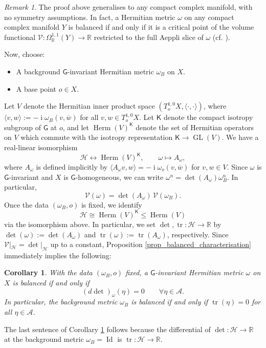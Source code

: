 \documentclass[11pt,reqno]{amsart}
\newcommand{\R}{\mathbb R}
\newcommand{\G}{\mathsf {G}}
\newcommand{\K}{\mathsf {K}}
\newcommand{\V}{\mathcal {V}}
\newcommand{\A}{\mathcal A}
\renewcommand{\H}{\mathcal H}
\renewcommand{\i}{\operatorname{i}}
\newcommand{\Id}{\operatorname{Id}}
\newcommand{\tr}{\operatorname{tr}}
\newcommand{\GL}{\operatorname{GL}}
\newcommand{\Herm}{{\operatorname{Herm}}}
\theoremstyle{plain}
\newtheorem{corollary}[theorem]{Corollary}
\theoremstyle{definition}
\theoremstyle{remark}
\newtheorem{remark}[theorem]{Remark}
\begin{document}
\begin{remark}
    \label{rem gen}
    The proof above generalises to any compact complex manifold,  with no symmetry assumptions. In fact, a Hermitian metric $\omega$ on any compact complex manifold $Y$ is balanced if and only if it is a critical point of the volume functional $\V: \Omega_\R^{1,1}(Y) \rightarrow \R$ restricted to the full Aeppli slice of $\omega$ (cf. \cite[Proof of Corollary 3.7]{popovici}). 
\end{remark}


Now, choose:
\begin{itemize}
    \item A  background $\G$-invariant Hermitian metric $\omega_B$ on $X$.
    \item A base point $o \in X$.
\end{itemize}
Let $V$ denote the Hermitian inner product space  $(T^{1,0}_o X, \langle \cdot,\cdot \rangle)$, where  $\langle v,w \rangle := - \i \omega_{B}(v, \overline w)$ for all $v,w \in T^{1,0}_o X$.
Let $\K$ denote the compact isotropy subgroup of $\G$ at $o$, and 
let $\Herm(V)^\K$ denote the set of Hermitian operators on $V$ which commute with the isotropy representation $\K \rightarrow \GL(V)$. We have a real-linear isomorphism 
$$ \H \longleftrightarrow \Herm(V)^\K, \qquad \omega \mapsto A_\omega,$$
where $A_\omega$ is defined implicitly by $\langle A_\omega v,w\rangle= - \i \omega_o(v, \overline w)$ for $v,w \in V$. Since $\omega$ is $\G$-invariant and $X$ is $\G$-homogeneous, we can write $\omega^n = \det(A_\omega) \omega_B^n$. In particular,
$$\V(\omega) = \det(A_\omega) \,\V(\omega_B).$$
Once the data $(\omega_B,o)$ is fixed, we identify 
$$\H \cong \Herm(V)^\K \leq \Herm(V)$$
via the isomorphism above.  In particular, we set $\det, \tr: \H \rightarrow \R$ by
$\det(\omega) := \det(A_\omega)$ and $\tr(\omega) := \tr(A_{\omega})$, respectively. Since $\V|_\H = \det|_\H$   up to a constant, Proposition \ref{prop_balanced_characterisation} immediately implies the following:
\begin{corollary}
    \label{cor det}
    With the data $(\omega_B,o)$ fixed, a $\G$-invariant Hermitian metric $\omega$ on $X$ is balanced if and only if 
    $$(d \det)_\omega(\eta) = 0 \qquad \forall \eta \in \A.$$
    In particular, the background metric $\omega_B$ is balanced if and only if $\tr(\eta) = 0$ for all $\eta \in \A$.
\end{corollary}
The last sentence of Corollary \ref{cor det} follows because the  differential of $\det:\H \rightarrow \R$ at the background metric $\omega_B = \Id$ is  $\tr:\H \rightarrow \R$.
\end{document}
